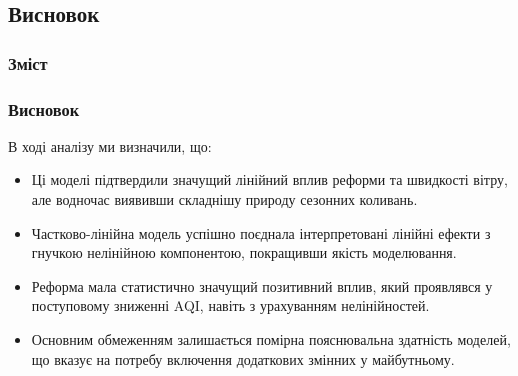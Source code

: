 ﻿\documentclass{beamer}
\begin{document}
\begin{frame}
  \section{Висновок}

  \frametitle{Зміст}
  \tableofcontents[currentsection]
\end{frame}


\begin{frame}
  \frametitle{Висновок}
  
  В ході аналізу ми визначили, що:
  
   \begin{itemize}
    \item Ці моделі підтвердили значущий лінійний вплив реформи та швидкості вітру, але водночас виявивши складнішу природу сезонних коливань. 
    \item Частково-лінійна модель успішно поєднала інтерпретовані лінійні ефекти з гнучкою нелінійною компонентою, покращивши якість моделювання. 
    \item Реформа мала статистично значущий позитивний вплив, який проявлявся у поступовому зниженні AQI, навіть з урахуванням нелінійностей.
    \item Основним обмеженням залишається помірна пояснювальна здатність моделей, що вказує на потребу включення додаткових змінних у майбутньому.
  \end{itemize}
\end{frame}
\end{document}
